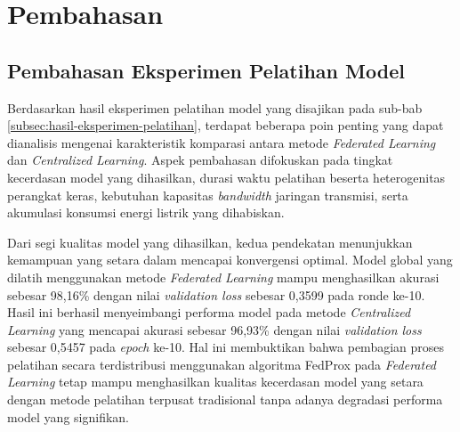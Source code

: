 \section{Pembahasan}
\label{sec:pembahasan}

\subsection{Pembahasan Eksperimen Pelatihan Model}
\label{subsec:pembahasan-pelatihan}

Berdasarkan hasil eksperimen pelatihan model yang disajikan pada sub-bab \ref{subsec:hasil-eksperimen-pelatihan}, terdapat beberapa poin penting yang dapat dianalisis mengenai karakteristik komparasi antara metode \textit{Federated Learning} dan \textit{Centralized Learning}. Aspek pembahasan difokuskan pada tingkat kecerdasan model yang dihasilkan, durasi waktu pelatihan beserta heterogenitas perangkat keras, kebutuhan kapasitas \textit{bandwidth} jaringan transmisi, serta akumulasi konsumsi energi listrik yang dihabiskan.

Dari segi kualitas model yang dihasilkan, kedua pendekatan menunjukkan kemampuan yang setara dalam mencapai konvergensi optimal. Model global yang dilatih menggunakan metode \textit{Federated Learning} mampu menghasilkan akurasi sebesar 98,16\% dengan nilai \textit{validation loss} sebesar 0,3599 pada ronde ke-10. Hasil ini berhasil menyeimbangi performa model pada metode \textit{Centralized Learning} yang mencapai akurasi sebesar 96,93\% dengan nilai \textit{validation loss} sebesar 0,5457 pada \textit{epoch} ke-10. Hal ini membuktikan bahwa pembagian proses pelatihan secara terdistribusi menggunakan algoritma FedProx pada \textit{Federated Learning} tetap mampu menghasilkan kualitas kecerdasan model yang setara dengan metode pelatihan terpusat tradisional tanpa adanya degradasi performa model yang signifikan.

